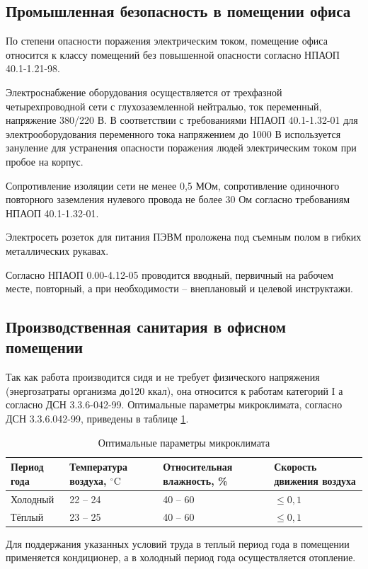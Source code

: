 \subsection{Промышленная безопасность в помещении офиса}

По степени опасности поражения электрическим током, помещение офиса относится к классу помещений без повышенной
опасности согласно НПАОП 40.1-1.21-98.

Электроснабжение оборудования осуществляется от трехфазной четырехпроводной сети с глухозаземленной нейтралью,
ток переменный, напряжение 380/220 В. В соответствии с требованиями НПАОП 40.1-1.32-01 для электрооборудования
переменного тока напряжением до 1000 В используется зануление для устранения опасности поражения людей электрическим
током при пробое на корпус. 

Сопротивление изоляции сети не менее 0,5 МОм, сопротивление одиночного повторного
заземления нулевого провода не более 30 Ом согласно требованиям НПАОП 40.1-1.32-01. 

Электросеть розеток для питания ПЭВМ проложена под съемным полом в гибких металлических рукавах.

Согласно НПАОП 0.00-4.12-05 проводится вводный, первичный на рабочем месте, повторный, а при необходимости -- 
внеплановый и целевой инструктажи.

\subsection{Производственная санитария в офисном помещении}

Так как работа производится сидя и не требует физического напряжения (энергозатраты организма до120 ккал),
она относится к работам категорий I а согласно ДСН 3.3.6-042-99. Оптимальные параметры микроклимата,
согласно ДСН 3.3.6.042-99, приведены в таблице \ref{tab:clima}.
\begin{table}[!ht]
    \centering
    \caption{Оптимальные параметры микроклимата}
    \label{tab:clima}

    \begin{tabular}{|p{2.5cm}|p{4.5cm}|p{4cm}|p{4cm}|}
\hline
Период года & Температура воздуха, \(^{\circ}\mathrm{C}\) & Относительная влажность, \% & Скорость движения воздуха \\
\hline
Холодный    & 22 -- 24                                    & 40 -- 60                    & \(\le 0,1\) \\
\hline
Тёплый      & 23 -- 25                                    & 40 -- 60                    & \(\le 0,1 \) \\
\hline
    \end{tabular}
\end{table}
Для поддержания указанных условий труда в теплый период года в помещении применяется кондиционер,
а в холодный период года осуществляется отопление. 

